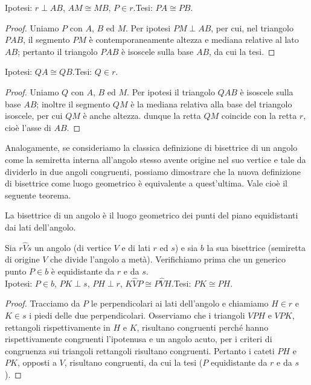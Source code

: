 \noindent Ipotesi: $r\perp AB$, $AM\cong MB$, $P\in r$.\tab Tesi: $PA\cong PB$.

\begin{proof}
Uniamo $P$ con $A$, $B$ ed $M$. Per ipotesi $PM \perp AB$, per cui, nel triangolo $PAB$, il segmento $PM$ è contemporaneamente altezza e mediana relative al lato $AB$; pertanto il triangolo $PAB$ è isoscele sulla base $AB$, da cui la tesi.
\end{proof}

\noindent Ipotesi: $QA\cong QB$.\tab Tesi: $Q\in r$.

\begin{proof}
Uniamo $Q$ con $A$, $B$ ed $M$. Per ipotesi il triangolo $QAB$ è isoscele sulla base $AB$; inoltre il segmento $QM$ è la mediana relativa alla base del triangolo isoscele, per cui $QM$ è anche altezza. dunque la retta $QM$ coincide con la retta $r$, cioè l'asse di $AB$.
\end{proof}

Analogamente, se consideriamo la classica definizione di bisettrice di un angolo come la semiretta interna all'angolo stesso avente origine nel suo vertice e tale da dividerlo in due angoli congruenti, possiamo dimostrare che la nuova definizione di bisettrice come luogo geometrico è equivalente a quest'ultima.
Vale cioè il seguente teorema.
\begin{teorema}
La bisettrice di un angolo è il luogo geometrico dei punti del piano equidistanti dai lati dell'angolo.
\end{teorema}
Sia $r\widehat{V}s$ un angolo (di vertice $V$ e di lati $r$ ed $s$) e sia $b$ la sua bisettrice (semiretta di origine $V$ che divide l'angolo a metà).
Verifichiamo prima che un generico punto $P\in b$ è equidistante da $r$ e da $s$.
~\\

\noindent Ipotesi: $P\in b$, $PK\perp s$, $PH\perp r$, $K\widehat{V}P\cong P\widehat{V}H$.\tab Tesi: $PK\cong PH$.

\begin{proof}
Tracciamo da $P$ le perpendicolari ai lati dell'angolo e chiamiamo $H\in r$ e $K\in s$ i piedi delle due perpendicolari. Osserviamo che i triangoli $VPH$ e $VPK$, rettangoli rispettivamente in $H$ e $K$, risultano congruenti perché hanno rispettivamente congruenti l'ipotenusa e un angolo acuto, per i criteri di congruenza sui triangoli rettangoli risultano congruenti. Pertanto i cateti $PH$ e $PK$, opposti a $V$, risultano congruenti, da cui la tesi ($P$ equidistante da $r$ e da $s$).
\end{proof}

